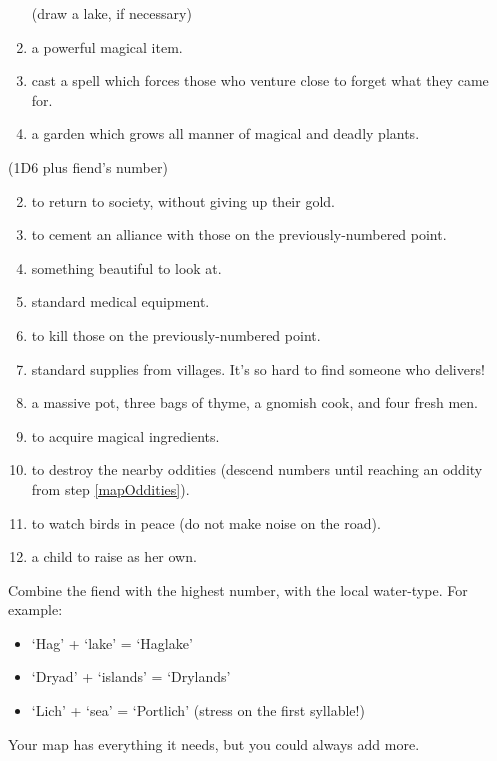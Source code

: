 \begin{multicols}{2}
\begin{enumerate}
  (draw a lake, if necessary)
\item
  a powerful magical item.
\item
  cast a spell which forces those who venture close to forget what they
  came for.
\item
  a garden which grows all manner of magical and deadly plants.
\end{enumerate}


(1D6 plus fiend's number)

\begin{enumerate}
\setcounter{enumi}{1}
\item
  to return to society, without giving up their gold.
\item
  to cement an alliance with those on the previously-numbered point.
\item
  something beautiful to look at.
\item
  standard medical equipment.
\item
  to kill those on the previously-numbered point.
\item
  standard supplies from villages. It's so hard to find someone who
  delivers!
\item
  a massive pot, three bags of thyme, a gnomish cook, and four fresh men.
\item
  to acquire magical ingredients.
\item
  to destroy the nearby oddities (descend numbers until reaching an oddity from step \ref{mapOddities}).
\item
  to watch birds in peace (do not make noise on the road).
\item
  a child to raise as her own.
\end{enumerate}


Combine the fiend with the highest number, with the local water-type.
For example:

\begin{itemize}
\item
  `Hag' + `lake' = `Haglake'
\item
  `Dryad' + `islands' = `Drylands'
\item
  `Lich' + `sea' = `Portlich' (stress on the first syllable!)
\end{itemize}



Your map has everything it needs, but you could always add more.


\end{multicols}
